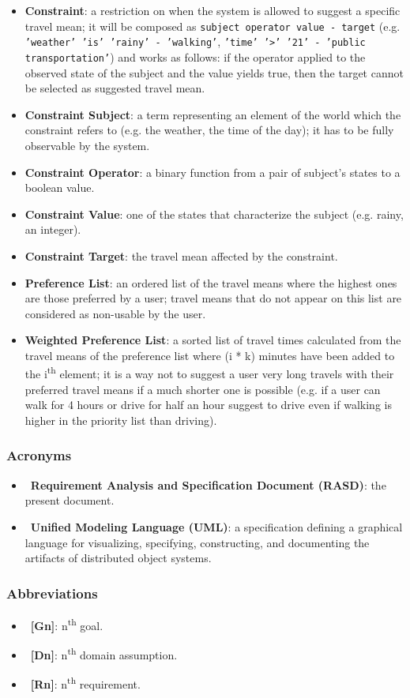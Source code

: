 \begin{itemize}
\item \textbf{Constraint}: a restriction on when the system is allowed to suggest a specific travel mean; it will be composed as \texttt{subject operator value - target} (e.g. \texttt{'weather' 'is' 'rainy' - 'walking'}, \texttt{'time' '>' '21' - 'public transportation'}) and works as follows: if the operator applied to the observed state of the subject and the value yields true, then the target cannot be selected as suggested travel mean.
\item \textbf{Constraint Subject}: a term representing an element of the world which the constraint refers to (e.g. the weather, the time of the day); it has to be fully observable by the system.
\item \textbf{Constraint Operator}: a binary function from a pair of subject's states to a boolean value.
\item \textbf{Constraint Value}: one of the states that characterize the subject (e.g. rainy, an integer).
\item \textbf{Constraint Target}: the travel mean affected by the constraint.

\item \textbf{Preference List}: an ordered list of the travel means where the highest ones are those preferred by a user; travel means that do not appear on this list are considered as non-usable by the user.
\item \textbf{Weighted Preference List}: a sorted list of travel times calculated from the travel means of the preference list where (i * k) minutes have been added to the i\textsuperscript{th} element; it is a way not to suggest a user very long travels with their preferred travel means if a much shorter one is possible (e.g. if a user can walk for 4 hours or drive for half an hour suggest to drive even if walking is higher in the priority list than driving).
\end{itemize}

\subsubsection{Acronyms}

\begin{itemize}
\item~\textbf{Requirement Analysis and Specification Document (RASD)}: the present document.
\item~\textbf{Unified Modeling Language (UML)}: a specification defining a graphical language for visualizing, specifying, constructing, and documenting the artifacts of distributed object systems.

\end{itemize}

\subsubsection{Abbreviations}

\begin{itemize}
\item~\textbf{[Gn]}: n\textsuperscript{th} goal.
\item~\textbf{[Dn]}: n\textsuperscript{th} domain assumption.
\item~\textbf{[Rn]}: n\textsuperscript{th} requirement.
\end{itemize}
